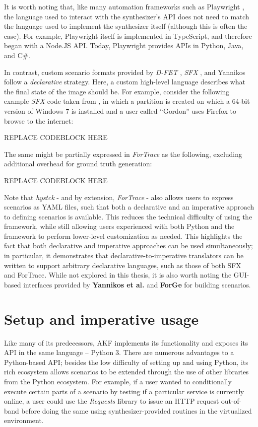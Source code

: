 \documentclass[letterpaper,12pt]{report}
\begin{document}
It is worth noting that, like many automation frameworks such as
Playwright \cite{MicrosoftPlaywrightpython2025}, the language used
to interact with the synthesizer's API does not need to match the
language used to implement the synthesizer itself (although this is
often the case). For example, Playwright itself is implemented in
TypeScript, and therefore began with a Node.JS API. Today, Playwright
provides APIs in Python, Java, and C\#.

In contrast, custom scenario formats provided by \emph{D-FET}
\cite{williamCloudbasedDigitalForensics2011}, \emph{SFX}
\cite{russellForensicImageDescription2012}, and Yannikos
\cite{yannikosDataCorporaDigital2014} follow a \emph{declarative}
strategy. Here, a custom high-level language describes what the final
state of the image should be. For example, consider the following
example \emph{SFX} code taken from
\cite{russellForensicImageDescription2012}, in which a partition is
created on which a 64-bit version of Windows 7 is installed and a user
called ``Gordon'' uses Firefox to browse to the internet:

REPLACE CODEBLOCK HERE

The same might be partially expressed in \emph{ForTrace} as the
following, excluding additional overhead for ground truth generation:

REPLACE CODEBLOCK HERE

Note that \emph{hystck} - and by extension, \emph{ForTrace} - also
allows users to express scenarios as YAML files, such that both a
declarative and an imperative approach to defining scenarios is
available. This reduces the technical difficulty of using the framework,
while still allowing users experienced with both Python and the
framework to perform lower-level customization as needed. This
highlights the fact that both declarative and imperative approaches can
be used simultaneously; in particular, it demonstrates that
declarative-to-imperative translators can be written to support
arbitrary declarative languages, such as those of both SFX and ForTrace.
While not explored in this thesis, it is also worth noting the GUI-based
interfaces provided by \textbf{Yannikos et al.} and \textbf{ForGe} for
building scenarios.

\section{Setup and imperative
usage}\label{setup-and-imperative-usage}

Like many of its predecessors, AKF implements its functionality and
exposes its API in the same language -- Python 3. There are numerous
advantages to a Python-based API; besides the low difficulty of setting
up and using Python, its rich ecosystem allows scenarios to be extended
through the use of other libraries from the Python ecosystem. For
example, if a user wanted to conditionally execute certain parts of a
scenario by testing if a particular service is currently online, a user
could use the \emph{Requests} library \cite{Requests31Documentation}
to issue an HTTP request out-of-band before doing the same using
synthesizer-provided routines in the virtualized environment.
\end{document}
